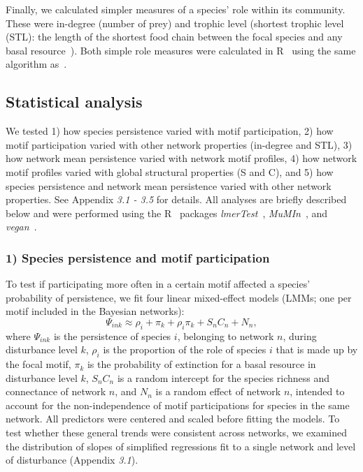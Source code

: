 \documentclass[12pt]{article}
\begin{document}
\begin{spacing}{2.0}
        Finally, we calculated simpler measures of a species' role within its community.
        These were in-degree (number of prey) and trophic level (shortest trophic level (STL): the length of the shortest food chain between the focal species and any basal resource~\citep{Williams2004}).
        Both simple role measures were calculated in R~\citep{R} using the same algorithm as~\citet{Eklof2013}.
        


	\subsection*{Statistical analysis} 

	We tested 1) how species persistence varied with motif participation, 2) how motif participation varied with other network properties (in-degree and STL), 3) how network mean persistence varied with network motif profiles, 4) how network motif profiles varied with global structural properties (S and C), and 5) how species persistence and network mean persistence varied with other network properties.
	See Appendix \emph{3.1 - 3.5} for details. 
	All analyses are briefly described below and were performed using the R~\citep{R} packages \emph{lmerTest}~\citep{lmerTest}, \emph{MuMIn}~\citep{MuMIn}, and \emph{vegan}~\citep{vegan}.

    
    \subsubsection*{1) Species persistence and motif participation}

        To test if participating more often in a certain motif affected a species' probability of persistence, we fit four linear mixed-effect models (LMMs; one per motif included in the Bayesian networks):
            \begin{equation}
                \Psi_{ink} \approx \rho_{i} + \pi_{k} + \rho_{i}\pi_{k} +
                S_{n}C_{n} + N_n,
                \label{propreq}
            \end{equation}
        \noindent where $\Psi_{ink}$ is the persistence of species $i$, belonging to network $n$, during disturbance level $k$, $\rho_{i}$ is the proportion of the role of species $i$ that is made up by the focal motif, $\pi_k$ is the probability of extinction for a basal resource in disturbance level $k$,  $S_{n}C_{n}$ is a random intercept for the species richness and connectance of network $n$, and $N_n$ is a random effect of network $n$, intended to account for the non-independence of motif participations for species in the same network.
        All predictors were centered and scaled before fitting the models.         
        To test whether these general trends were consistent across networks, we examined the distribution of slopes of simplified regressions fit to a single network and level of disturbance (Appendix \emph{3.1}).
    

\end{spacing}
\end{document}
